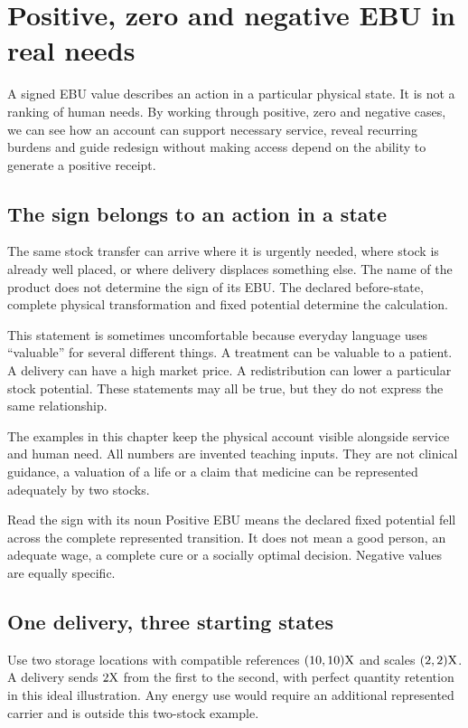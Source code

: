 \chapter{Positive, zero and negative EBU in real needs}\label{ch:signs}

A signed EBU value describes an action in a particular physical state. It is not a ranking of human needs. By working through positive, zero and negative cases, we can see how an account can support necessary service, reveal recurring burdens and guide redesign without making access depend on the ability to generate a positive receipt.


\section{The sign belongs to an action in a state}
The same stock transfer can arrive where it is urgently needed, where stock is already well placed, or where delivery displaces something else. The name of the product does not determine the sign of its EBU. The declared before-state, complete physical transformation and fixed potential determine the calculation.

This statement is sometimes uncomfortable because everyday language uses ``valuable'' for several different things. A treatment can be valuable to a patient. A delivery can have a high market price. A redistribution can lower a particular stock potential. These statements may all be true, but they do not express the same relationship.

The examples in this chapter keep the physical account visible alongside service and human need. All numbers are invented teaching inputs. They are not clinical guidance, a valuation of a life or a claim that medicine can be represented adequately by two stocks.

\begin{intuitionbox}{Read the sign with its noun}
Positive EBU means the declared fixed potential fell across the complete represented transition. It does not mean a good person, an adequate wage, a complete cure or a socially optimal decision. Negative values are equally specific.
\end{intuitionbox}

\section{One delivery, three starting states}
Use two storage locations with compatible references $(10,10)\mathrm{X}$ and scales $(2,2)\mathrm{X}$. A delivery sends $2\mathrm{X}$ from the first to the second, with perfect quantity retention in this ideal illustration. Any energy use would require an additional represented carrier and is outside this two-stock example.

